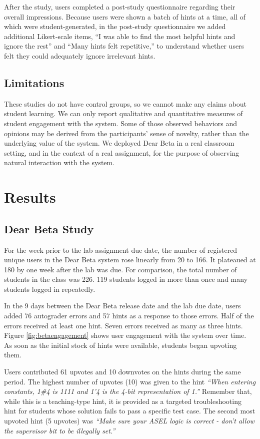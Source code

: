 After the study, users completed a post-study questionnaire regarding their overall impressions. Because users were shown a batch of hints at a time, all of which were student-generated, in the post-study questionnaire we added additional Likert-scale items, ``I was able to find the most helpful hints and ignore the rest'' and ``Many hints felt repetitive,'' to understand whether users felt they could adequately ignore irrelevant hints. 

\subsection{Limitations}
These studies do not have control groups, so we cannot make any claims about student learning. We can only report qualitative and quantitative measures of student engagement with the system. Some of those observed behaviors and opinions may be derived from the participants' sense of novelty, rather than the underlying value of the system. We deployed Dear Beta in a real classroom setting, and in the context of a real assignment, for the purpose of observing natural interaction with the system. 


\section{Results}

\subsection{Dear Beta Study}

For the week prior to the lab assignment due date, the number of registered unique users in the Dear Beta system rose linearly from 20 to 166. It plateaued at 180 by one week after the lab was due. For comparison, the total number of students in the class was 226. 119 students logged in more than once and many students logged in repeatedly.

In the 9 days between the Dear Beta release date and the lab due date, users added 76 autograder errors and 57 hints as a response to those errors. Half of the errors received at least one hint. Seven errors received as many as three hints. Figure \ref{fig:betaengagement} shows user engagement with the system over time. As soon as the initial stock of hints were available, students began upvoting them.

Users contributed 61 upvotes and 10 downvotes on the hints during the same period. The highest number of upvotes (10) was given to the hint {\it ``When entering constants, 1\#4 is 1111 and 1'4 is the 4-bit representation of 1.''} Remember that, while this is a teaching-type hint, it is provided as a targeted troubleshooting hint for students whose solution fails to pass a specific test case. The second most upvoted hint (5 upvotes) was {\it ``Make sure your ASEL logic is correct - don't allow the supervisor bit to be illegally set.''} 

